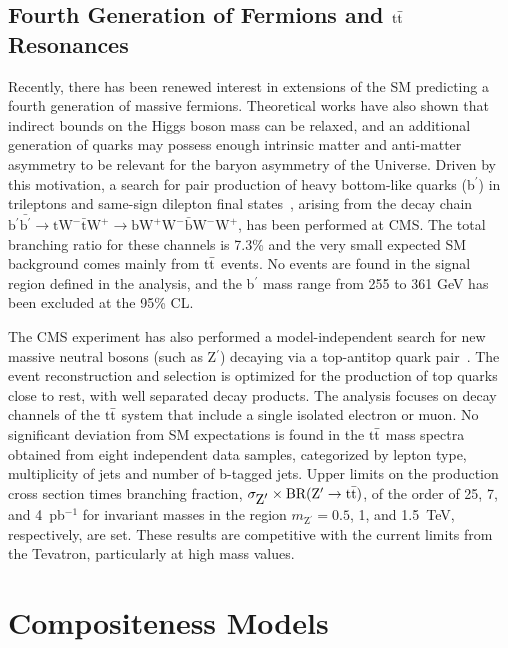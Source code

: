 \documentclass[11pt]{article}
\def\GeVmass {GeV\xspace}
\def\Zprime{Z$^\prime$\xspace}
\def\bprime{b$^\prime$\xspace}
\def\ttbar{\ensuremath{\rm{t} \bar{\rm{t}}}\xspace}
\def\pb{pb$^{-1}$\xspace}
\begin{document}
\subsection{Fourth Generation of Fermions and \ttbar Resonances}

Recently, there has been renewed interest in extensions of the SM 
predicting a fourth generation of massive fermions. 
Theoretical works have also shown that indirect bounds on the Higgs boson mass 
can be relaxed, and an additional generation of quarks may possess 
enough intrinsic matter and anti-matter asymmetry to be relevant for 
the baryon asymmetry of the Universe. Driven by this motivation, a search 
for pair production of heavy bottom-like quarks (\bprime) in trileptons 
and same-sign dilepton final states~\cite{Chatrchyan:2011em}, arising from the decay 
chain $\mbox{\bprime}\bar{\mbox{\bprime}} \rightarrow \mbox{tW}^{-}\bar{\mbox{t}}\mbox{W}^{+} \rightarrow \mbox{bW}^{+}\mbox{W}^{-}\bar{\mbox{b}}\mbox{W}^{-}\mbox{W}^+$, has been performed at CMS.
The total branching ratio for these channels is 7.3\% and the very small 
expected SM background comes mainly from \ttbar events. No events are found in
the signal region defined in the analysis, and the \bprime mass range from 
255 to 361 \GeVmass has been excluded at the 95\% CL.

The CMS experiment has also performed a model-independent search for 
new massive neutral bosons (such as \Zprime) decaying via a top-antitop 
quark pair~\cite{CMSPAS:TOP-10-007}. 
The event reconstruction and selection is optimized for the 
production of top quarks close to rest, with well separated decay products. 
The analysis focuses on decay channels of the \ttbar system that include a 
single isolated electron or muon. No significant deviation from SM expectations 
is found in the \ttbar mass spectra obtained from eight independent data samples, 
categorized by lepton type, multiplicity of jets and number of b-tagged jets. 
Upper limits on the production cross section times branching fraction, 
$\sigma_{\mbox{\Zprime}} \times \mbox{BR}(\mbox{\Zprime}\rightarrow\mbox{\ttbar})$, 
of the order of 25, 7, and 4~\pb for invariant masses in the 
region $m_{\mbox{\Zprime}}=0.5$, 1, and 1.5~TeV, respectively, are set. 
These results are competitive with the current limits from the Tevatron, 
particularly at high mass values.

\section{Compositeness Models}\label{sec:compositeness}
\end{document}
